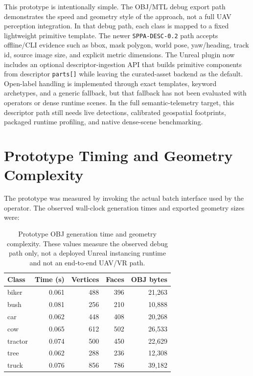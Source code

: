 ﻿\documentclass[11pt,a4paper]{article}
\begin{document}
This prototype is intentionally simple. The OBJ/MTL debug export path
demonstrates the speed and geometry style of the approach, not a full UAV
perception integration. In that debug path, each class is mapped to a fixed
lightweight primitive template. The newer \texttt{SPPA-DESC-0.2} path accepts
offline/CLI evidence such as bbox, mask polygon, world pose, yaw/heading,
track id, source image size, and explicit metric dimensions. The Unreal plugin
now includes an optional descriptor-ingestion API that builds primitive
components from descriptor \texttt{parts[]} while leaving the curated-asset
backend as the default. Open-label handling is implemented through exact
templates, keyword archetypes, and a generic fallback, but that fallback has not
been evaluated with operators or dense runtime scenes. In the full semantic-telemetry
target, this descriptor path still needs live
detections, calibrated geospatial footprints, packaged runtime profiling, and
native dense-scene benchmarking.

\section{Prototype Timing and Geometry Complexity}

The prototype was measured by invoking the actual batch interface used by the
operator. The observed wall-clock generation times and exported geometry sizes
were:

\begin{table}[h]
\centering
\caption{Prototype OBJ generation time and geometry complexity. These values
measure the observed debug path only, not a deployed Unreal instancing runtime
and not an end-to-end UAV/VR path.}
\label{tab:timing}
\begin{tabular}{@{}lrrrr@{}}
\toprule
Class & Time (s) & Vertices & Faces & OBJ bytes \\
\midrule
biker & 0.061 & 488 & 396 & 21,263 \\
bush & 0.081 & 256 & 210 & 10,888 \\
car & 0.062 & 448 & 408 & 20,268 \\
cow & 0.065 & 612 & 502 & 26,533 \\
tractor & 0.074 & 500 & 450 & 22,629 \\
tree & 0.062 & 288 & 236 & 12,308 \\
truck & 0.076 & 856 & 786 & 39,182 \\
\bottomrule
\end{tabular}
\end{table}
\end{document}
